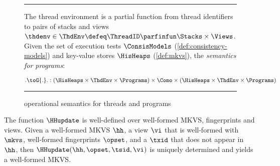 \begin{figure}[!ht]
\hrule\vspace{5pt}
\begin{flushleft}
The thread environment is a partial function from thread identifiers to pairs of stacks and views \( \thdenv \in \ThdEnv \defeq \ThreadID \parfinfun \Stacks \times \Views \).
Given the set of execution tests \( \ConsisModels \) (\cref{def:consistency-models}) and key-value stores \(\HisHeaps\) (\cref{def:mkvs}), the \emph{semantics for programs}:
\end{flushleft}
\[
	. \toG{.} . : 
    ( \HisHeaps \times \ThdEnv \times \Programs) 
    \times \Como 
    \times ( \HisHeaps \times \ThdEnv \times \Programs) 
\]
\begin{mathpar}
\end{mathpar}
%
\hrule
\caption{operational semantics for threads and programs}
\label{def:thread_semantics}
\label{fig:thread_semantics}
\label{def:thread_pool_semantics}
\label{def:program_semantics}
\label{fig:thread_pool_semantics}
\end{figure}

\begin{lemma}
\label{lem:hhupdate.welldefined}
The function $\HHupdate$ is well-defined over well-formed MKVS, fingerprints and views. 
Given a well-formed MKVS $\hh$, a view $\vi$ that is well-formed with \( \mkvs \), well-formed fingerprints \( \opset \), and a $\txid$ that does not appear in $\hh$, then $\HHupdate(\hh, \opset, \tsid, \vi)$ is uniquely determined and yields a well-formed MKVS.
\end{lemma}

